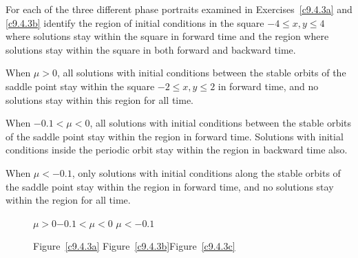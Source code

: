 \documentclass{ximera}
\begin{document}
\begin{exercise} \label{c9.4.3c}
For each of the three different phase portraits examined in 
Exercises~\ref{c9.4.3a} and \ref{c9.4.3b} identify the region of initial 
conditions in the square $-4\leq x,y \leq 4$ where solutions stay within the 
square in forward time and the region where solutions stay within the square 
in both forward and backward time.

\begin{solution}

When $\mu > 0$, all solutions with initial conditions between the
stable orbits of the saddle point stay within the square $-2 \leq
x,y \leq 2$ in forward time, and no solutions stay within this region
for all time.

\para When $-0.1 < \mu < 0$, all solutions with initial
conditions between the stable orbits of the saddle point stay within the
region in forward time.  Solutions with initial conditions inside the
periodic orbit stay within the region in backward time also.

\para When $\mu < -0.1$, only solutions with initial conditions along the
stable orbits of the saddle point stay within the region in forward time,
and no solutions stay within the region for all time.

\begin{figure}[htb]
                       \centerline{%
                       }
		\centerline{$\mu > 0$\hspace{1.2in}$-0.1 < \mu < 0$
\hspace{1.2in}$\mu < -0.1$}
		\centerline{Figure~\ref{c9.4.3a}\hspace{1.2in}
Figure~\ref{c9.4.3b}\hspace{1.2in}Figure~\ref{c9.4.3c}}
\end{figure}

\end{solution}
\end{exercise}
\end{document}

